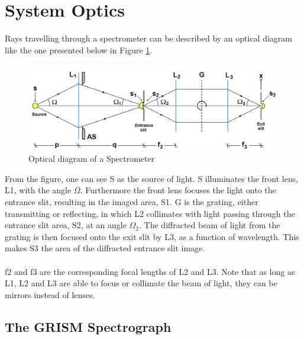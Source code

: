 
\vspace{1.3cm}
\section{System Optics}
Rays travelling through a spectrometer can be described by an optical diagram like the one presented below in Figure \ref{fig:sysopt}.
\begin{figure}[H]
    \centering
    \includegraphics[width = 12cm]{Images/theory/sysop.png}
    \caption{Optical diagram of a Spectrometer}
    \label{fig:sysopt}
\end{figure}
\noindent
From the figure, one can see S as the source of light. S illuminates the front lens, L1, with the angle $\Omega$. Furthermore the front lens focuses the light onto the entrance slit, resulting in the imaged area, S1. G is the grating, either transmitting or reflecting, in which L2 collimates with light passing through the entrance slit area, S2, at an angle  $\Omega_2$. The diffracted beam of light from the grating is then focused onto the exit slit by L3, as a function of wavelength. This makes S3 the area of the diffracted entrance slit image. 
\\\\
f2 and f3 are the corresponding focal lengths of L2 and L3. Note that as long as L1, L2 and L3 are able to focus or collimate the beam of light, they can be mirrors instead of lenses. 


\subsection{The GRISM Spectrograph}

